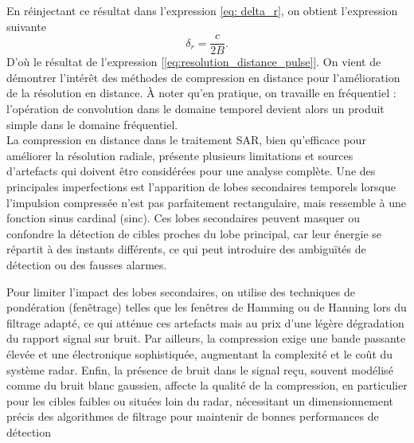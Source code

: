 En réinjectant ce résultat dans l'expression \ref{eq: delta_r}, on obtient l'expression suivante
\begin{equation}
    \delta_r=\frac{c}{2B}. 
\end{equation}
D'où le résultat de l'expression [\ref{eq:resolution_distance_pulse}]. On vient de démontrer l'intérêt des méthodes de compression en distance pour l'amélioration de la résolution en distance. À noter qu'en pratique, on travaille en fréquentiel : l'opération de convolution dans le domaine temporel devient alors un produit simple dans le domaine fréquentiel. \\ 
La compression en distance dans le traitement SAR, bien qu’efficace pour améliorer la résolution radiale, présente plusieurs limitations et sources d’artefacts qui doivent être considérées pour une analyse complète. Une des principales imperfections est l’apparition de lobes secondaires temporels lorsque l’impulsion compressée n’est pas parfaitement rectangulaire, mais ressemble à une fonction sinus cardinal (sinc). Ces lobes secondaires peuvent masquer ou confondre la détection de cibles proches du lobe principal, car leur énergie se répartit à des instants différents, ce qui peut introduire des ambiguïtés de détection ou des fausses alarmes.

Pour limiter l’impact des lobes secondaires, on utilise des techniques de pondération (fenêtrage) telles que les fenêtres de Hamming ou de Hanning lors du filtrage adapté, ce qui atténue ces artefacts mais au prix d’une légère dégradation du rapport signal sur bruit. Par ailleurs, la compression exige une bande passante élevée et une électronique sophistiquée, augmentant la complexité et le coût du système radar. Enfin, la présence de bruit dans le signal reçu, souvent modélisé comme du bruit blanc gaussien, affecte la qualité de la compression, en particulier pour les cibles faibles ou situées loin du radar, nécessitant un dimensionnement précis des algorithmes de filtrage pour maintenir de bonnes performances de détection

